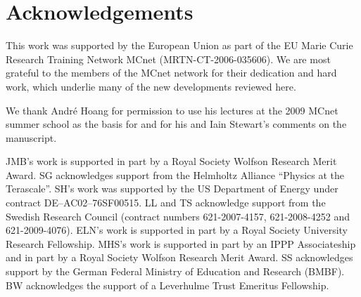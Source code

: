 \documentclass[preprint,12pt]{elsarticle}
\begin{document}
\label{sec:herwig++--thepeg}


\mcsection{\pythiaeight}
\label{sec:pythia8}


\mcsection{\Sherpa}
\label{sec:sherpa}


\label{sec:comp-gener-with}

\label{sec:phys-phil-behind}


\label{sec:rivet-professor}


\label{sec:physics-areas-where}



\clearpage
\part*{Acknowledgements}\label{sec:acknowledgements}
This work was supported by the European Union as part of the EU Marie
Curie Research Training Network MCnet (MRTN-CT-2006-035606).  We are
most grateful to the members of the MCnet network for their dedication
and hard work, which underlie many of the new developments reviewed here.

We thank Andr\'e Hoang for permission to use his lectures at
the 2009 MCnet summer school as the basis for
 and for his and Iain Stewart's comments on
the manuscript.

JMB's work is supported in part by
a Royal Society Wolfson Research Merit Award. 
SG acknowledges support from the Helmholtz Alliance ``Physics at the
Terascale''. 
SH's work was supported by the US Department of Energy 
under contract DE--AC02--76SF00515.
LL and TS acknowledge support from the Swedish Research Council
(contract numbers 621-2007-4157, 621-2008-4252 and 621-2009-4076).
ELN's work is supported in part by
a Royal Society University Research Fellowship. 
MHS's work is supported in part by an IPPP Associateship and in part by
a Royal Society Wolfson Research Merit Award.
SS acknowledges support by the German Federal Ministry of Education and 
Research (BMBF). 
BW acknowledges the support of a Leverhulme Trust Emeritus Fellowship.

\end{document}
